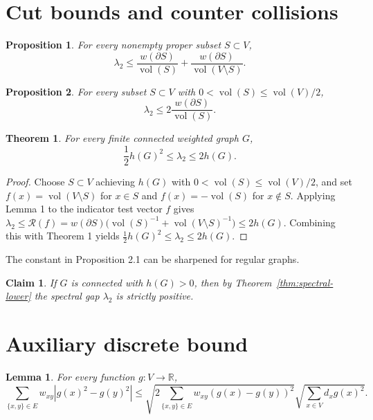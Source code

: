 \documentclass{article}
\newtheorem{theorem}{Theorem}
\newtheorem{lemma}{Lemma}
\newtheorem{proposition}{Proposition}[section]
\newtheorem*{claim*}{Claim}
\begin{document}
\section{Cut bounds and counter collisions}
\label{sec:cuts}

\begin{proposition}
\label{prop:cut-upper}
For every nonempty proper subset $S \subset V$,
\[
\lambda_2 \le \frac{w(\partial S)}{\operatorname{vol}(S)} + \frac{w(\partial S)}{\operatorname{vol}(V \setminus S)}.
\]
\end{proposition}

\addtocounter{proposition}{-1}

\begin{proposition}
\label{prop:cut-refined}
For every subset $S \subset V$ with $0 < \operatorname{vol}(S) \le \operatorname{vol}(V)/2$,
\[
\lambda_2 \le 2 \frac{w(\partial S)}{\operatorname{vol}(S)}.
\]
\end{proposition}

\begin{theorem}
\label{thm:cheeger}
For every finite connected weighted graph $G$,
\[
\frac{1}{2} h(G)^2 \le \lambda_2 \le 2 h(G).
\]
\end{theorem}
\begin{proof}
Choose $S \subset V$ achieving $h(G)$ with $0 < \operatorname{vol}(S) \le \operatorname{vol}(V)/2$,
and set $f(x) = \operatorname{vol}(V \setminus S)$ for $x \in S$ and
$f(x) = -\operatorname{vol}(S)$ for $x \notin S$.
Applying Lemma 1 to the indicator test vector $f$ gives
$\lambda_2 \le \mathcal{R}(f) = w(\partial S)\bigl(\operatorname{vol}(S)^{-1} + \operatorname{vol}(V \setminus S)^{-1}\bigr) \le 2 h(G)$.
Combining this with Theorem 1 yields $\frac{1}{2} h(G)^2 \le \lambda_2 \le 2 h(G)$.
\end{proof}

The constant in Proposition 2.1 can be sharpened for regular graphs.

\begin{claim*}
If $G$ is connected with $h(G) > 0$, then by Theorem~\ref{thm:spectral-lower}
the spectral gap $\lambda_2$ is strictly positive.
\end{claim*}

\appendix

\section{Auxiliary discrete bound}
\label{sec:app-bound}
\setcounter{lemma}{0}
\renewcommand{\thelemma}{A.\arabic{lemma}}

\begin{lemma}
\label{lem:app-sum}
For every function $g : V \to \mathbb{R}$,
\[
\sum_{\{x,y\} \in E} w_{xy} |g(x)^2 - g(y)^2|
\le \sqrt{2 \sum_{\{x,y\} \in E} w_{xy} (g(x) - g(y))^2}
    \sqrt{\sum_{x \in V} d_x g(x)^2}.
\]
\end{lemma}
\end{document}
